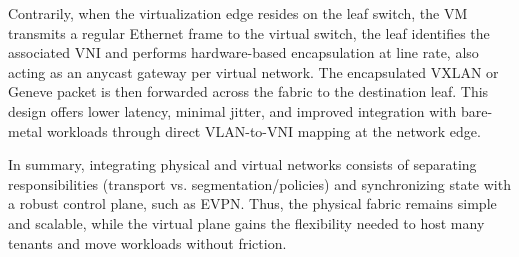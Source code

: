 Contrarily, when the virtualization edge resides on the leaf switch, the VM transmits a regular Ethernet frame to the virtual switch, the leaf identifies the associated VNI and performs hardware-based encapsulation at line rate, also acting as an anycast gateway per virtual network. The encapsulated VXLAN or Geneve packet is then forwarded across the fabric to the destination leaf. This design offers lower latency, minimal jitter, and improved integration with bare-metal workloads through direct VLAN-to-VNI mapping at the network edge.

In summary, integrating physical and virtual networks consists of separating responsibilities (transport vs. segmentation/policies) and synchronizing state with a robust control plane, such as EVPN. Thus, the physical fabric remains simple and scalable, while the virtual plane gains the flexibility needed to host many tenants and move workloads without friction.

